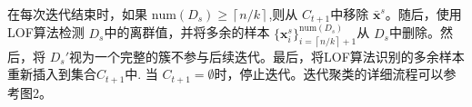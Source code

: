 \documentclass[12pt,a4paper]{article}%
\begin{document}
	
	

	在每次迭代结束时，如果 $\text{num}(D_s){\ge}\left\lceil n/k\right\rceil$,则从 $C_{t+1}$中移除 $\bar{\boldsymbol{x}}^s$。随后，使用LOF算法检测 $D_s$中的离群值，并将多余的样本
	$\{\boldsymbol{x}^s_i\}_{i=\left\lceil n/k\right\rceil+1}^{\text{num}(D_s)}$从 $D_s$中删除。然后，将 $D_s'$视为一个完整的簇不参与后续迭代。最后，将LOF算法\cite{bib14}识别的多余样本重新插入到集合$C_{t+1}$中.
	当 $C_{t+1}= \emptyset $时，停止迭代。迭代聚类的详细流程可以参考图2。
\end{document}
